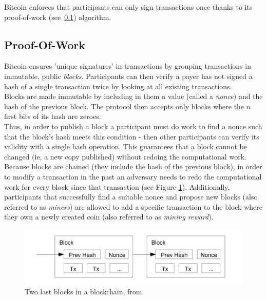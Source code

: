 Bitcoin enforces that participants can only sign transactions once thanks to its proof-of-work
(see~\ref{subsec:btc:pow}) algorithm.

\subsection{Proof-Of-Work}\label{subsec:btc:pow}

Bitcoin ensures 'unique signatures' in transactions by grouping transactions in immutable, public \textit{blocks}.
Participants can then verify a payer has not signed a hash of a single transaction twice by looking at all existing
transactions.\\

Blocks are made immutable by including in them a value (called a \textit{nonce}) and the hash of the previous block.
The protocol then accepts only blocks where the $n$ first bits of its hash are zeroes. \\

Thus, in order to publish a block a participant must do work to find a nonce such that the block's hash meets this
condition - then other participants can verify its validity with a single hash operation.
This guarantees that a block cannot be changed (ie, a new copy published) without redoing the computational work.
Because blocks are chained (they include the hash of the previous block), in order to modify a transaction in the past
an adversary needs to redo the computational work for every block since that transaction (see Figure
\ref{fig:bitcoin-blockchain}).
Additionally, participants that successfully find a suitable nonce and propose new blocks (also referred to as
\textit{miners}) are allowed to add a specific transaction to the block where they own a newly created coin (also
referred to as \textit{mining reward}).

\begin{figure}[th]
    \centering
    \includegraphics[width=0.8\columnwidth]{figures/bitcoin-blockchain}
    \caption[Two last blocks in a blockhain]{Two last blocks in a blockchain, from~\cite{nakamoto2008bitcoin}}
    \label{fig:bitcoin-blockchain}
\end{figure}


